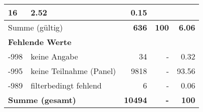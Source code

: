 \begin{longtable}{lXrrr}
       \num{16} &
       \num[round-mode=places,round-precision=2]{2.52} &
         \num[round-mode=places,round-precision=2]{0.15} \\
     \midrule
     \multicolumn{2}{l}{Summe (gültig)} &
       \textbf{\num{636}} &
     \textbf{\num{100}} &
       \textbf{\num[round-mode=places,round-precision=2]{6.06}} \\
     \multicolumn{5}{l}{\textbf{Fehlende Werte}}\\
       -998 &
       keine Angabe &
         \num{34} &
        - &
         \num[round-mode=places,round-precision=2]{0.32} \\
       -995 &
       keine Teilnahme (Panel) &
         \num{9818} &
        - &
         \num[round-mode=places,round-precision=2]{93.56} \\
       -989 &
       filterbedingt fehlend &
         \num{6} &
        - &
         \num[round-mode=places,round-precision=2]{0.06} \\
     \midrule
     \multicolumn{2}{l}{\textbf{Summe (gesamt)}} &
          \textbf{\num{10494}} &
        \textbf{-} &
        \textbf{\num{100}} \\
     \bottomrule
     \end{longtable}
     
